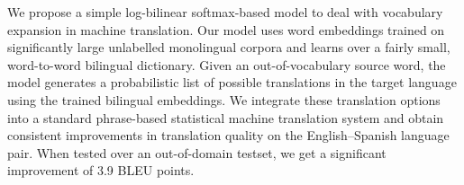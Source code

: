 We propose a simple log-bilinear softmax-based model to deal with vocabulary expansion in machine translation. Our model uses word embeddings trained on significantly large unlabelled monolingual corpora and learns over a fairly small, word-to-word bilingual dictionary. Given an out-of-vocabulary source word, the model generates a probabilistic list of possible translations in the target language using the trained bilingual embeddings. We integrate these translation options into a standard phrase-based statistical machine translation system and obtain consistent improvements in translation quality on the English--Spanish language pair. When tested over an out-of-domain testset, we get a significant improvement of 3.9 BLEU points.
